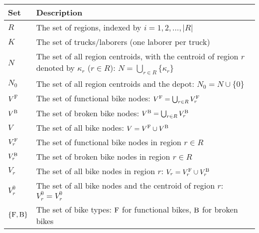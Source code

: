 \renewcommand{\arraystretch}{1.25}
\begin{longtable}{p{2cm}p{10cm}}
    \toprule
    Set          & Description                                                                                                                              \\
    \midrule
    \endhead
    $R$          & The set of regions, indexed by $i=1,2,\ldots,|R|$                                                                                        \\
    $K$          & The set of trucks/laborers (one laborer per truck)                                                                                       \\
    $N$          & The set of all region centroids, with the centroid of region $r$ denoted by $\kappa_r$ ($r \in R$): $N = \bigcup_{r \in R} \{\kappa_r\}$ \\
    $N_0$        & The set of all region centroids and the depot: $N_0 = N \cup \{0\}$                                                                      \\
    $V^{\text{F}}$     & The set of functional bike nodes: $V^{\text{F}} = \bigcup_{r \in R} V_r^{\text{F}}$                                                                  \\
    $V^{\text{B}}$     & The set of broken bike nodes: $V^{\text{B}} = \bigcup_{r \in R} V_r^{\text{B}}$                                                                      \\
    $V$          & The set of all bike nodes: $V = V^{\text{F}} \cup V^{\text{B}}$                                                                                      \\
    $V_r^{\text{F}}$   & The set of functional bike nodes in region $r \in R$                                                                                     \\
    $V_r^{\text{B}}$   & The set of broken bike nodes in region $r \in R$                                                                                         \\
    $V_r$        & The set of all bike nodes in region $r$: $V_r = V_r^{\text{F}} \cup V_r^{\text{B}}$                                                                  \\
    $V^0_r$      & The set of all bike nodes and the centroid of region $r$: $V^0_r = V^0_r$                                                                \\
    $\{\text{F}, \text{B}\}$ & The set of bike types: $\text{F}$ for functional bikes, $\text{B}$ for broken bikes                                                                  \\
    \bottomrule
\end{longtable}

